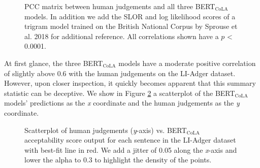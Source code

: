 \begin{figure}[h]
    \caption[PCC matrix between human judgements, BERT$_\mathrm{CoLA}$, \newline and a trigram model]{PCC matrix between human judgements and all three BERT$_\mathrm{CoLA}$ models.  In addition we add the SLOR and log likelihood scores of a trigram model trained on the British National Corpus by Sprouse et al. 2018 for additional reference.  All correlations shown have a $p$ < 0.0001.}
    \label{fig:bert_acc_correlation_matrix}
\end{figure}

At first glance, the three BERT$_\mathrm{CoLA}$ models have a moderate positive correlation of slightly above 0.6 with the human judgements on the LI-Adger dataset.  However, upon closer inspection, it quickly becomes apparent that this summary statistic can be deceptive.  We show in Figure \ref{fig:bert_acc_correlation_plot} a scatterplot of the BERT$_\mathrm{CoLA}$ models' predictions as the \textit{x} coordinate and the human judgements as the \textit{y} coordinate. 

\begin{figure}[h]
    \caption[Human judgements vs. BERT$_\mathrm{CoLA}$ acceptability scores \newline on LI-Adger dataset]{Scatterplot of human judgements (\textit{y}-axis) vs. BERT$_\mathrm{CoLA}$ acceptability score output for each sentence in the LI-Adger dataset with best-fit line in red.  We add a jitter of 0.05 along the \textit{x}-axis and lower the alpha to 0.3 to highlight the density of the points.}
    \label{fig:bert_acc_correlation_plot}
\end{figure}

